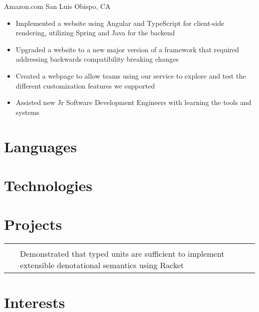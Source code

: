 \documentclass[11pt,a4paper,sans,final]{moderncv}
\makeatletter
\newcommand{\project}[3]{
    \begin{tabular}{p{\hintscolumnwidth}@{\hspace{\separatorcolumnwidth}}p{\maincolumnwidth}@{}}
        \raggedleft\hintstyle{#1} & #2\\
                            ~     & #3
    \end{tabular}
}
\makeatother
\begin{document}
\begin{FlushLeft}
        {Amazon.com}
        {San Luis Obispo, CA}
        {}
        {
            \begin{itemize}
                \item Implemented a website using Angular and TypeScript for client-side rendering, utilizing Spring and Java for the backend
                \item Upgraded a website to a new major version of a framework that required addressing backwards compatibility breaking changes
                \item Created a webpage to allow teams using our service to explore and test the different customization features we supported
                \item Assisted new Jr Software Development Engineers with learning the tools and systems
            \end{itemize}
        }

    \section{Languages}

    \section{Technologies}

    \section{Projects}
    \project{Senior Project}
        {\httplink{https://github.com/thewells1024/SeniorProject}}
        {
            \raggedright{Demonstrated that typed units are sufficient to implement extensible denotational semantics using Racket}
        }

    \section{Interests}
\end{FlushLeft}
\end{document}
